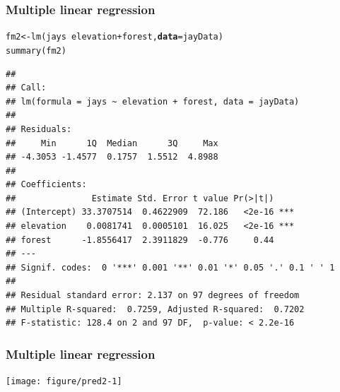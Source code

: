 \documentclass[color=usenames,dvipsnames]{beamer}\usepackage[]{graphicx}\usepackage[]{color}
\makeatletter
\newcommand{\hlopt}[1]{\textcolor[rgb]{0,0,0}{#1}}%
\newcommand{\hlstd}[1]{\textcolor[rgb]{0,0,0}{#1}}%
\newcommand{\hlkwb}[1]{\textcolor[rgb]{0,0.341,0.682}{#1}}%
\newcommand{\hlkwc}[1]{\textcolor[rgb]{0,0,0}{\textbf{#1}}}%
\newcommand{\hlkwd}[1]{\textcolor[rgb]{0.004,0.004,0.506}{#1}}%
\newenvironment{kframe}{%
 \def\at@end@of@kframe{}%
 \ifinner\ifhmode%
  \def\at@end@of@kframe{\end{minipage}}%
  \begin{minipage}{\columnwidth}%
 \fi\fi%
 \def\FrameCommand##1{\hskip\@totalleftmargin \hskip-\fboxsep
 \colorbox{shadecolor}{##1}\hskip-\fboxsep
     \hskip-\linewidth \hskip-\@totalleftmargin \hskip\columnwidth}%
 \MakeFramed {\advance\hsize-\width
   \@totalleftmargin\z@ \linewidth\hsize
   \@setminipage}}%
 {\par\unskip\endMakeFramed%
 \at@end@of@kframe}
\newenvironment{knitrout}{}{} %
\makeatother
\begin{document}
\begin{frame}[fragile]
  \frametitle{Multiple linear regression}
\begin{knitrout}\scriptsize
{}\color{fgcolor}\begin{kframe}
\begin{alltt}
\hlstd{fm2} \hlkwb{<-} \hlkwd{lm}\hlstd{(jays} \hlopt{~} \hlstd{elevation}\hlopt{+}\hlstd{forest,} \hlkwc{data}\hlstd{=jayData)}
\hlkwd{summary}\hlstd{(fm2)}
\end{alltt}
\begin{verbatim}
## 
## Call:
## lm(formula = jays ~ elevation + forest, data = jayData)
## 
## Residuals:
##     Min      1Q  Median      3Q     Max 
## -4.3053 -1.4577  0.1757  1.5512  4.8988 
## 
## Coefficients:
##               Estimate Std. Error t value Pr(>|t|)    
## (Intercept) 33.3707514  0.4622909  72.186   <2e-16 ***
## elevation    0.0081741  0.0005101  16.025   <2e-16 ***
## forest      -1.8556417  2.3911829  -0.776     0.44    
## ---
## Signif. codes:  0 '***' 0.001 '**' 0.01 '*' 0.05 '.' 0.1 ' ' 1
## 
## Residual standard error: 2.137 on 97 degrees of freedom
## Multiple R-squared:  0.7259,	Adjusted R-squared:  0.7202 
## F-statistic: 128.4 on 2 and 97 DF,  p-value: < 2.2e-16
\end{verbatim}
\end{kframe}
\end{knitrout}
\end{frame}




\begin{frame}[fragile]
  \frametitle{Multiple linear regression}
\begin{knitrout}
\color{fgcolor}
\texttt{[image: figure/pred2-1]} 

\end{knitrout}
\end{frame}
\end{document}
